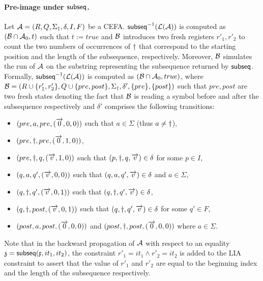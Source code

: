 \paragraph*{Pre-image under ${\sf subseq}$.}
%
Let $\mathcal{A} = (R, Q, \Sigma_{\dag}, \delta, I, F)$ be a CEFA. 
${\sf subseq}^{-1}(\mathcal{L}(\mathcal{A}))$ is computed as $(\mathcal{B}\cap \mathcal{A}_0, t)$ such that $t:= true$ and $\mathcal{B}$ introduces two fresh registers $r'_1, r'_2$ to count the two numbers of occurrences of $\dag$ that correspond to the starting position and the length of the subsequence, respectively. Moreover, $\mathcal{B}$ simulates the run of $\mathcal{A}$ on the substring representing the subsequence returned by ${\sf subseq}$. 
%
Formally, ${\sf subseq}^{-1}(\mathcal{L}(\mathcal{A}))$ is computed as $(\mathcal{B} \cap \mathcal{A}_0, true)$, where $\mathcal{B} = (R \cup \{r'_1, r'_2\}, Q \cup \{pre, post\}, \Sigma_{\dag}, \delta', \{pre\}, \{post\})$ such that $pre, post$ are two fresh states denoting the fact that $\mathcal{B}$ is reading a symbol before and after the subsequence respectively and $\delta'$ comprises the  following transitions:
\begin{itemize}[topsep=0pt,partopsep=0pt]
\item $(pre, a, pre, (\overrightarrow{0}, 0,0))$ such that $a \in \Sigma$ (thus $a \neq \dag$),  
%
\item $(pre, \dag, pre, (\overrightarrow{0}, 1,0))$,
%
\item $(pre, \dag, q, (\overrightarrow{v}, 1,0))$ such that $(p, \dag, q, \overrightarrow{v}) \in \delta$ for some $p \in I$, 
%
\item $(q, a, q', (\overrightarrow{v}, 0, 0))$ such that $(q, a, q', \overrightarrow{v}) \in \delta$ and $a \in \Sigma$, 
%
\item $(q, \dag, q', (\overrightarrow{v}, 0,1))$ such that $(q, \dag, q', \overrightarrow{v}) \in \delta$,
%
\item $(q, \dag, post, (\overrightarrow{v}, 0,1))$ such that $(q, \dag, q', \overrightarrow{v}) \in \delta$ for some $q' \in F$,
%
\item $(post, a, post, (\overrightarrow{0}, 0,0))$ and $(post, \dag, post, (\overrightarrow{0}, 0,0))$ where $a \in \Sigma$.
\end{itemize}
Note that in the backward propagation of $\mathcal{A}$ with respect to an equality $\mathfrak{z} = {\sf subseq}(\mathfrak{x}, it_1, it_2)$, the constraint $r'_1 = it_1 \wedge r'_2 = it_2$ is added to the LIA constraint to assert that the value of $r'_1$ and $r'_2$ are equal to the beginning index and the length of the subsequence respectively.

